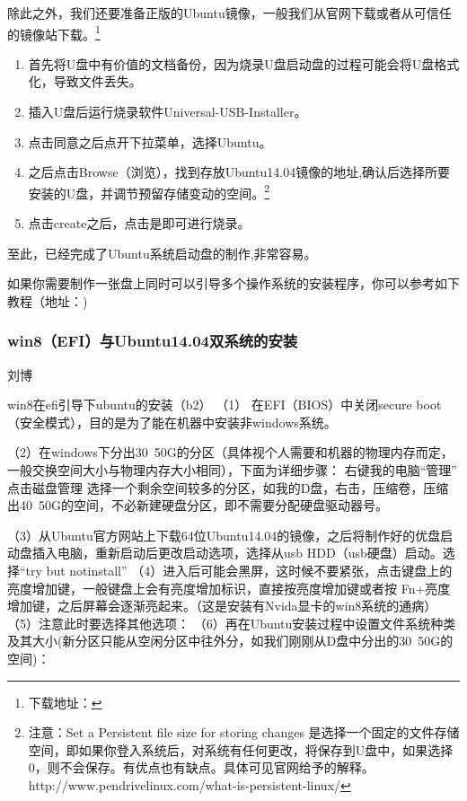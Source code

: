 除此之外，我们还要准备正版的Ubuntu镜像，一般我们从官网下载或者从可信任的镜像站下载。\footnote{下载地址：}
\begin{enumerate}

	\item 首先将U盘中有价值的文档备份，因为烧录U盘启动盘的过程可能会将U盘格式化，导致文件丢失。
	
	\item 插入U盘后运行烧录软件Universal-USB-Installer。
	
	\item 点击同意之后点开下拉菜单，选择Ubuntu。
	
	\item 之后点击Browse（浏览），找到存放Ubuntu14.04镜像的地址,确认后选择所要安装的U盘，并调节预留存储变动的空间。\footnote{注意：Set a Persistent file size for storing changes 是选择一个固定的文件存储空间，即如果你登入系统后，对系统有任何更改，将保存到U盘中，如果选择0，则不会保存。有优点也有缺点。具体可见官网给予的解释。http://www.pendrivelinux.com/what-is-persistent-linux/}

	\item 点击create之后，点击是即可进行烧录。
\end{enumerate}

至此，已经完成了Ubuntu系统启动盘的制作,非常容易。

如果你需要制作一张盘上同时可以引导多个操作系统的安装程序，你可以参考如下教程（地址：)

\subsubsection{win8（EFI）与Ubuntu14.04双系统的安装}
刘博

win8在efi引导下ubuntu的安装（b2）
（1）	在EFI（BIOS）中关闭secure boot（安全模式），目的是为了能在机器中安装非windows系统。

（2）在windows下分出30~50G的分区（具体视个人需要和机器的物理内存而定，一般交换空间大小与物理内存大小相同），下面为详细步骤：
右键我的电脑“管理”
点击磁盘管理
选择一个剩余空间较多的分区，如我的D盘，右击，压缩卷，压缩出40~50G的空间，不必新建硬盘分区，即不需要分配硬盘驱动器号。

（3）从Ubuntu官方网站上下载64位Ubuntu14.04的镜像，之后将制作好的优盘启动盘插入电脑，重新启动后更改启动选项，选择从usb HDD（usb硬盘）启动。选择“try but notinstall” 
（4）进入后可能会黑屏，这时候不要紧张，点击键盘上的亮度增加键，一般键盘上会有亮度增加标识，直接按亮度增加键或者按 Fn+亮度增加键，之后屏幕会逐渐亮起来。（这是安装有Nvida显卡的win8系统的通病）
（5）注意此时要选择其他选项： 
（6）再在Ubuntu安装过程中设置文件系统种类及其大小(新分区只能从空闲分区中往外分，如我们刚刚从D盘中分出的30~50G的空间)：

